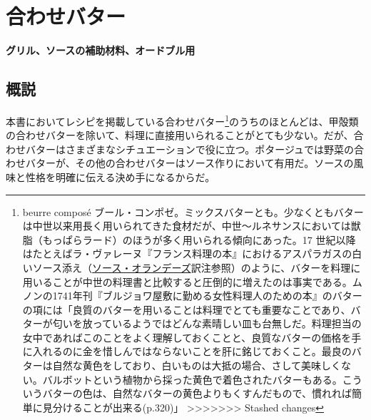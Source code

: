 \href{未、原文対照チェック}{} \href{未、日本語表現校正}{}
\href{未、その他修正}{} \href{未、原稿最終校正}{}

\hypertarget{beurres-composes}{%
\section{合わせバター}\label{beurres-composes}}

\vspace{-1\zw}
\begin{center}
\textbf{グリル、ソースの補助材料、オードブル用}
\end{center}
\vspace{1\zw}


 

\hypertarget{observation-sur-les-beurres-composes}{%
\subsection{概説}\label{observation-sur-les-beurres-composes}}

本書においてレシピを掲載している合わせバター\footnote{beurre composé
  ブール・コンポゼ。ミックスバターとも。少なくともバターは中世以来用長く用いられてきた食材だが、中世〜ルネサンスにおいては獣脂（もっぱらラード）のほうが多く用いられる傾向にあった。17
  世紀以降はたとえばラ・ヴァレーヌ『フランス料理の本』におけるアスパラガスの白いソース添え（\protect\hyperlink{sauce-hollandaise}{ソース・オランデーズ}訳注参照）のように、バターを料理に用いることが中世の料理書と比較すると圧倒的に増えたのは事実である。ムノンの1741年刊『ブルジョワ屋敷に勤める女性料理人のための本』のバターの項には「良質のバターを用いることは料理でとても重要なことであり、バターが匂いを放っているようではどんな素晴しい皿も台無しだ。料理担当の女中であればこのことをよく理解しておくことと、良質なバターの価格を手に入れるのに金を惜しんではならないことを肝に銘じておくこと。最良のバターは自然な黄色をしており、白いものは大抵の場合、さして美味しくない。バルボットという植物から採った黄色で着色されたバターもある。こういうバターの色は、自然なバターの黄色よりもくすんだもので、慣れれば簡単に見分けることが出来る(p.320)」
  \textgreater{}\textgreater{}\textgreater{}\textgreater{}\textgreater{}\textgreater{}\textgreater{}
  Stashed changes}のうちのほとんどは、甲殻類の合わせバターを除いて、料理に直接用いられることがとても少ない。だが、合わせバターはさまざまなシチュエーションで役に立つ。ポタージュでは野菜の合わせバターが、その他の合わせバターはソース作りにおいて有用だ。ソースの風味と性格を明確に伝える決め手になるからだ。

